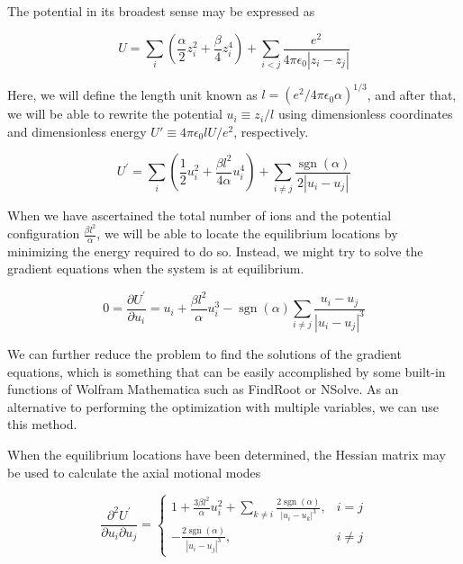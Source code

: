 The potential in its broadest sense may be expressed as

\begin{equation}
    U=\sum_i\left(\frac{\alpha}{2} z_i^2+\frac{\beta}{4} z_i^4\right)+\sum_{i<j} \frac{e^2}{4 \pi \epsilon_0\left|z_i-z_j\right|}
\end{equation}

Here, we will define the length unit known as $l=\left(e^2 / 4 \pi \epsilon_0 \alpha\right)^{1 / 3}$, and after that, we will be able to rewrite the potential \(u_i\equiv z_i/l\) using dimensionless coordinates and dimensionless energy \(U'\equiv 4\pi \epsilon_0 lU/e^2\), respectively.

\begin{equation}
    U^{\prime}=\sum_i\left(\frac{1}{2} u_i^2+\frac{\beta l^2}{4 \alpha} u_i^4\right)+\sum_{i \neq j} \frac{\operatorname{sgn}(\alpha)}{2\left|u_i-u_j\right|}
\end{equation}

When we have ascertained the total number of ions and the potential configuration \(\frac{\beta l^2}{\alpha}\), we will be able to locate the equilibrium locations by minimizing the energy required to do so. Instead, we might try to solve the gradient equations when the system is at equilibrium.

\begin{equation}
    0=\frac{\partial U^{\prime}}{\partial u_i}=u_i+\frac{\beta l^2}{\alpha} u_i^3-\operatorname{sgn}(\alpha) \sum_{i \neq j} \frac{u_i-u_j}{\left|u_i-u_j\right|^3}
\end{equation}

We can further reduce the problem to find the solutions of the gradient equations, which is something that can be easily accomplished by some built-in functions of Wolfram Mathematica such as FindRoot or NSolve. As an alternative to performing the optimization with multiple variables, we can use this method.

When the equilibrium locations have been determined, the Hessian matrix may be used to calculate the axial motional modes

\begin{equation}
    \frac{\partial^2 U^{\prime}}{\partial u_i \partial u_j}= \begin{cases}1+\frac{3 \beta l^2}{\alpha} u_i^2+\sum_{k \neq i} \frac{2 \operatorname{sgn}(\alpha)}{\left|u_i-u_k\right|^3}, & i=j \\ -\frac{2 \operatorname{sgn}(\alpha)}{\left|u_i-u_j\right|^3}, & i \neq j\end{cases}
\end{equation}

